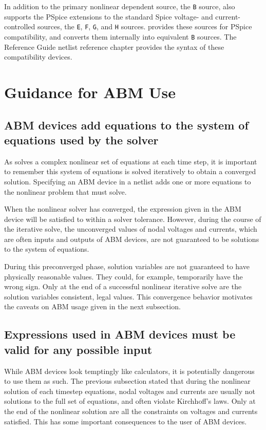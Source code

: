 In addition to the primary nonlinear dependent source, the \verb+B+
source, \Xyce{} also supports the PSpice extensions to the standard
Spice voltage- and current-controlled sources, the \verb+E+, \verb+F+,
\verb+G+, and \verb+H+ sources.  \Xyce{} provides these sources for
PSpice compatibility, and converts them internally into equivalent
\verb+B+ sources.  The \Xyce{} Reference Guide\ReferenceGuide{} netlist
reference chapter provides the syntax of these compatibility devices.

\section{Guidance for ABM Use}
\label{ABM_Guidance}

\subsection{ABM devices add equations to the system of equations used by the solver}

As \Xyce{} solves a complex nonlinear set of equations at each time
step, it is important to remember this system of equations is solved
iteratively to obtain a converged solution. Specifying an ABM device
in a \Xyce{} netlist adds one or more equations to the nonlinear
problem that \Xyce{} must solve.

When the nonlinear solver has converged, the expression given in the
ABM device will be satisfied to within a solver tolerance. However,
during the course of the iterative solve, the unconverged values of
nodal voltages and currents, which are often inputs and outputs of ABM
devices, are not guaranteed to be solutions to the system of
equations.

During this preconverged phase, solution variables are not guaranteed
to have physically reasonable values. They could, for example,
temporarily have the wrong sign. Only at the end of a successful
nonlinear iterative solve are the solution variables consistent, legal
values. This convergence behavior motivates the caveats on ABM usage given 
in the next subsection.   

\subsection{Expressions used in ABM devices must be valid for any possible input}

While ABM devices look temptingly like calculators, it is potentially
dangerous to use them as such. The previous subsection stated that
during the nonlinear solution of each timestep equations, nodal
voltages and currents are usually not solutions to the full set of
equations, and often violate Kirchhoff's laws. Only at the end of the
nonlinear solution are all the constraints on voltages and currents
satisfied. This has some important consequences to the user of ABM
devices.

